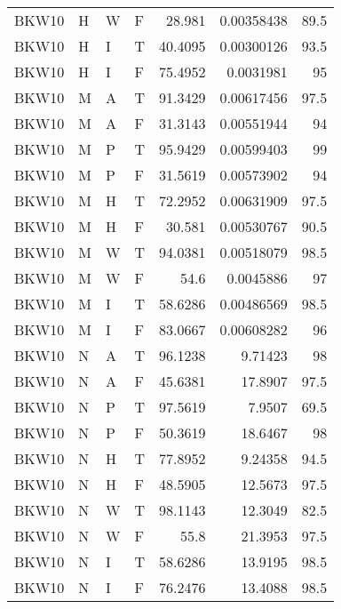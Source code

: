 \begin{table}[!htb]
{\begin{tabular}{llllrrr}
            BKW10    & H     & W     & F          & 28.981     & 0.00358438 & 89.5     \\
            BKW10    & H     & I     & T          & 40.4095    & 0.00300126 & 93.5     \\
            BKW10    & H     & I     & F          & 75.4952    & 0.0031981  & 95       \\
            BKW10    & M     & A     & T          & 91.3429    & 0.00617456 & 97.5     \\
            BKW10    & M     & A     & F          & 31.3143    & 0.00551944 & 94       \\
            BKW10    & M     & P     & T          & 95.9429    & 0.00599403 & 99       \\
            BKW10    & M     & P     & F          & 31.5619    & 0.00573902 & 94       \\
            BKW10    & M     & H     & T          & 72.2952    & 0.00631909 & 97.5     \\
            BKW10    & M     & H     & F          & 30.581     & 0.00530767 & 90.5     \\
            BKW10    & M     & W     & T          & 94.0381    & 0.00518079 & 98.5     \\
            BKW10    & M     & W     & F          & 54.6       & 0.0045886  & 97       \\
            BKW10    & M     & I     & T          & 58.6286    & 0.00486569 & 98.5     \\
            BKW10    & M     & I     & F          & 83.0667    & 0.00608282 & 96       \\
            BKW10    & N     & A     & T          & 96.1238    & 9.71423    & 98       \\
            BKW10    & N     & A     & F          & 45.6381    & 17.8907    & 97.5     \\
            BKW10    & N     & P     & T          & 97.5619    & 7.9507     & 69.5     \\
            BKW10    & N     & P     & F          & 50.3619    & 18.6467    & 98       \\
            BKW10    & N     & H     & T          & 77.8952    & 9.24358    & 94.5     \\
            BKW10    & N     & H     & F          & 48.5905    & 12.5673    & 97.5     \\
            BKW10    & N     & W     & T          & 98.1143    & 12.3049    & 82.5     \\
            BKW10    & N     & W     & F          & 55.8       & 21.3953    & 97.5     \\
            BKW10    & N     & I     & T          & 58.6286    & 13.9195    & 98.5     \\
            BKW10    & N     & I     & F          & 76.2476    & 13.4088    & 98.5     \\
            \hline
        \end{tabular}
    }{}
\end{table}
